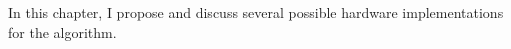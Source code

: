 In this chapter, I propose and discuss several possible hardware implementations
for the  algorithm.